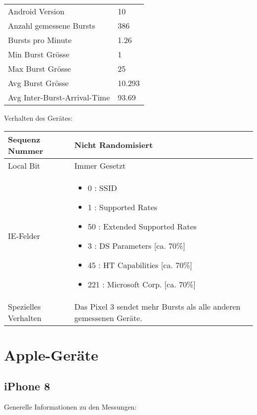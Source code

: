 \begin{table}[h!]
    \begin{tabularx}{\textwidth}{l X }
        \toprule
        Android Version & 10\\
        Anzahl gemessene Bursts & 386 \\
        Bursts pro Minute & 1.26 \\
        Min Burst Grösse & 1 \\
        Max Burst Grösse & 25 \\
        Avg Burst Grösse & 10.293 \\
        Avg Inter-Burst-Arrival-Time & 93.69 \\
        \bottomrule
    \end{tabularx}
\end{table}

Verhalten des Gerätes:

\begin{table}[h!]
    \begin{tabularx}{\textwidth}{l X }
        \toprule
        Sequenz Nummer & Nicht Randomisiert \\
        \midrule
        Local Bit & Immer Gesetzt \\
        \midrule
        IE-Felder & \begin{itemize}
            \item 0 : SSID
            \item 1 : Supported Rates
            \item 50 : Extended Supported Rates
            \item 3 : DS Parameters [ca. 70\%]
            \item 45 : HT Capabilities [ca. 70\%]
            \item 221 : Microsoft Corp. [ca. 70\%]
        \end{itemize} \\
        \midrule
        Spezielles Verhalten & Das Pixel 3 sendet mehr Bursts als alle anderen gemessenen Geräte. \\
        \bottomrule
    \end{tabularx}
\end{table}
\clearpage

\section*{Apple-Geräte}

\subsection*{iPhone 8}
Generelle Informationen zu den Messungen:

